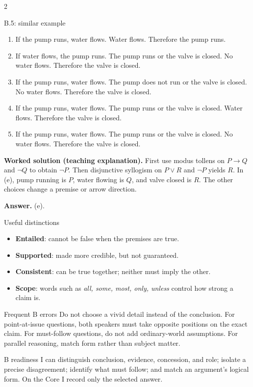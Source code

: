 \documentclass[10pt]{extarticle}
\newcommand{\term}[1]{\textbf{\color{ArgNavy}#1}}
\begin{document}
\begin{multicols}{2}
\begin{workedbox}{B.5: similar example}
\begin{enumerate}[label=(\alph*)]
\item If the pump runs, water flows. Water flows. Therefore the pump runs.
\item If water flows, the pump runs. The pump runs or the valve is closed. No water flows. Therefore the valve is closed.
\item If the pump runs, water flows. The pump does not run or the valve is closed. No water flows. Therefore the valve is closed.
\item If the pump runs, water flows. The pump runs or the valve is closed. Water flows. Therefore the valve is closed.
\item If the pump runs, water flows. The pump runs or the valve is closed. No water flows. Therefore the valve is closed.
\end{enumerate}
\textbf{Worked solution (teaching explanation).} First use modus tollens on $P\to Q$ and $\neg Q$ to obtain $\neg P$. Then disjunctive syllogism on $P\lor R$ and $\neg P$ yields $R$. In (e), pump running is $P$, water flowing is $Q$, and valve closed is $R$. The other choices change a premise or arrow direction.

\textbf{Answer.} (e).
\end{workedbox}

\begin{definitionbox}{Useful distinctions}
\begin{itemize}
  \item \term{Entailed}: cannot be false when the premises are true.
  \item \term{Supported}: made more credible, but not guaranteed.
  \item \term{Consistent}: can be true together; neither must imply the other.
  \item \term{Scope}: words such as \emph{all, some, most, only, unless} control
  how strong a claim is.
\end{itemize}
\end{definitionbox}

\begin{warningbox}{Frequent B errors}
Do not choose a vivid detail instead of the conclusion. For point-at-issue
questions, both speakers must take opposite positions on the exact claim. For
must-follow questions, do not add ordinary-world assumptions. For parallel
reasoning, match form rather than subject matter.
\end{warningbox}

\begin{checklistbox}{B readiness}
I can distinguish conclusion, evidence, concession, and role; isolate a precise
disagreement; identify what must follow; and match an argument's logical form.
On the Core I record only the selected answer.
\end{checklistbox}
\end{multicols}
\end{document}
